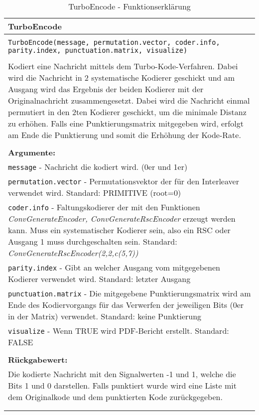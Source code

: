 \begin{longtable}{|p{\textwidth}|}
\hline
\rowcolor{lightblue}TurboEncode\\
\hline
\\
\texttt{TurboEncode(message, permutation.vector, coder.info, parity.index, punctuation.matrix, visualize)}\\
\\
Kodiert eine Nachricht mittels dem Turbo-Kode-Verfahren. Dabei wird die Nachricht in 2 systematische Kodierer geschickt und am Ausgang wird das Ergebnis der beiden Kodierer mit der Originalnachricht zusammengesetzt. Dabei wird die Nachricht einmal permutiert in den 2ten Kodierer geschickt, um die minimale Distanz zu erhöhen. Falls eine Punktierungsmatrix mitgegeben wird, erfolgt am Ende die Punktierung und somit die Erhöhung der Kode-Rate.\\
\\
\textbf{Argumente:}\\
\texttt{message} - Nachricht die kodiert wird. (0er und 1er)\\
\texttt{permutation.vector} - Permutationsvektor der für den Interleaver verwendet wird. Standard: PRIMITIVE (root=0)\\
\texttt{coder.info} - Faltungskodierer der mit den Funktionen \emph{ConvGenerateEncoder, ConvGenerateRscEncoder} erzeugt werden kann. Muss ein systematischer Kodierer sein, also ein RSC oder Ausgang 1 muss durchgeschalten sein. Standard: \emph{ConvGenerateRscEncoder(2,2,c(5,7))}\\
\texttt{parity.index} - Gibt an welcher Ausgang vom mitgegebenen Kodierer verwendet wird. Standard: letzter Ausgang\\
\texttt{punctuation.matrix} - Die mitgegebene Punktierungsmatrix wird am Ende des Kodiervorgangs für das Verwerfen der jeweiligen Bits (0er in der Matrix) verwendet. Standard: keine Punktierung\\
\texttt{visualize} - Wenn TRUE wird PDF-Bericht erstellt. Standard: FALSE\\
\\
\textbf{Rückgabewert:}\\
Die kodierte Nachricht mit den Signalwerten -1 und 1, welche die Bits 1 und 0 darstellen. Falls punktiert wurde wird eine Liste mit dem Originalkode und dem punktierten Kode zurückgegeben.\\
\\
\hline
\caption{TurboEncode - Funktionserklärung}
\end{longtable}